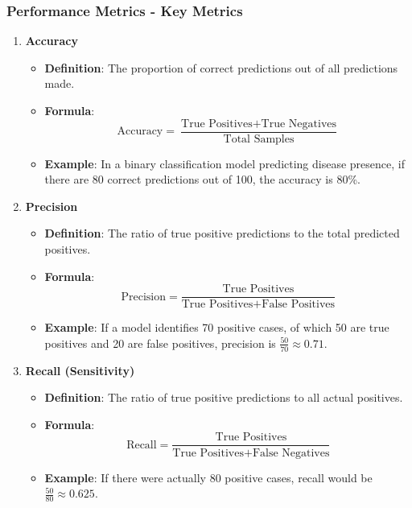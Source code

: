 \documentclass[aspectratio=169]{beamer}
\begin{document}
\begin{frame}[fragile]
    \frametitle{Performance Metrics - Key Metrics}
    \begin{enumerate}
        \item \textbf{Accuracy}
        \begin{itemize}
            \item \textbf{Definition}: The proportion of correct predictions out of all predictions made.
            \item \textbf{Formula}:
            \begin{equation}
            \text{Accuracy} = \frac{\text{True Positives} + \text{True Negatives}}{\text{Total Samples}}
            \end{equation}
            \item \textbf{Example}: In a binary classification model predicting disease presence, if there are 80 correct predictions out of 100, the accuracy is 80\%.
        \end{itemize}

        \item \textbf{Precision}
        \begin{itemize}
            \item \textbf{Definition}: The ratio of true positive predictions to the total predicted positives.
            \item \textbf{Formula}:
            \begin{equation}
            \text{Precision} = \frac{\text{True Positives}}{\text{True Positives} + \text{False Positives}}
            \end{equation}
            \item \textbf{Example}: If a model identifies 70 positive cases, of which 50 are true positives and 20 are false positives, precision is \( \frac{50}{70} \approx 0.71 \).
        \end{itemize}

        \item \textbf{Recall (Sensitivity)}
        \begin{itemize}
            \item \textbf{Definition}: The ratio of true positive predictions to all actual positives.
            \item \textbf{Formula}:
            \begin{equation}
            \text{Recall} = \frac{\text{True Positives}}{\text{True Positives} + \text{False Negatives}}
            \end{equation}
            \item \textbf{Example}: If there were actually 80 positive cases, recall would be \( \frac{50}{80} \approx 0.625 \).
        \end{itemize}
    \end{enumerate}
\end{frame}
\end{document}
